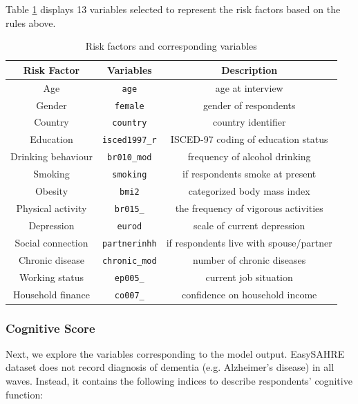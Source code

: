 \documentclass[11pt,twoside]{article}
\numberwithin{Theorem}{section}
\numberwithin{Definition}{section}
\numberwithin{Lemma}{section}
\numberwithin{Algorithm}{section}
\numberwithin{equation}{section}
\begin{document}
Table \ref{tab:vars} displays 13 variables selected to represent the risk factors based on the rules above.

\begin{table}[!h]
	\centering
	\begin{tabular}{|c|c|c|}
		\hline
		Risk Factor & Variables & Description \\
		\hline
		Age & \texttt{age} & age at interview \\ 
		Gender & \texttt{female} & gender of respondents \\
		Country & \texttt{country}  & country identifier\\
		Education & \texttt{isced1997\_r} & ISCED-97 coding of education status \\
		Drinking behaviour & \texttt{br010\_mod} & frequency of alcohol drinking \\
		Smoking & \texttt{smoking} & if respondents smoke at present \\
		Obesity & \texttt{bmi2} & categorized body mass index\\
		Physical activity & \texttt{br015\_} &  the frequency of vigorous activities \\
		Depression & \texttt{eurod} & scale of current depression \\
		Social connection & \texttt{partnerinhh} & if respondents live with spouse/partner \\
		Chronic disease & \texttt{chronic\_mod} & number of chronic diseases \\	
		Working status & \texttt{ep005\_} & current job situation \\
		Household finance & \texttt{co007\_} & confidence on household income \\
		\hline
	\end{tabular}
	\caption{Risk factors and corresponding variables}
	\label{tab:vars}
\end{table}

\subsubsection{Cognitive Score}

Next, we explore the variables corresponding to the model output. EasySAHRE dataset does not record diagnosis of dementia (e.g. Alzheimer's disease) in all waves. Instead, it contains the following indices to describe respondents' cognitive function:
\end{document}
